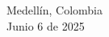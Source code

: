 \begin{titlepage}
\begin{minipage}{13.5cm}
{\large
Medellín, Colombia
}\\[0.1cm]

{\large
Junio 6 de 2025
}

\end{minipage}

\vfill %

\end{titlepage}




